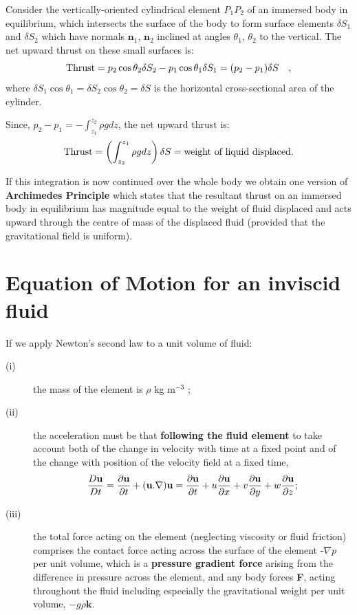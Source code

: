 \documentclass[twoside,a4paper,11pt]{report}
\begin{document}
Consider the vertically-oriented cylindrical element $P_{1} P_{2}$ of an 
immersed body in equilibrium, which intersects the surface of the body to 
form surface elements $\delta S_{1}$ and $\delta S_{2}$ which have 
normals $\textbf{n}_{1}$, $\textbf{n}_{2}$ inclined at angles $\theta _1$,
$\theta _2 $ to the vertical. The net upward thrust on these small 
surfaces is:
\[
\hbox{Thrust} =p_2 \cos \theta _2 \delta S_2 -p_1 \cos \theta _1 
\delta S_1 =(p_2 -p_1 )\delta S\quad ,
\]
where $\delta S_{1} \cos \theta _{1 }=\delta S_{2} \cos \theta 
_{2}=\delta S$ is the horizontal cross-sectional area of the cylinder. 

Since, $p_2 -p_1 =-\int_{z_1 }^{z_2 } {\rho gdz} $,
the net upward thrust is:
\[\hbox{Thrust}=\left( {\int_{z_2 }^{z_1 } {\rho gdz} } 
\right)\delta S = \hbox{weight of liquid displaced}. \]

If this integration is now continued over the whole body we obtain one 
version of \textbf{Archimedes Principle} which states that the resultant 
thrust on an immersed body in equilibrium has magnitude equal to the weight 
of fluid displaced and acts upward through the centre of mass of the 
displaced fluid (provided that the gravitational field is uniform).

\section{Equation of Motion for an inviscid fluid}
If we apply Newton's second law to a unit volume of fluid:
\begin{description}
\item[(i)] the mass of the element is $\rho $ kg m$^{-3}$ ;
\item[(ii)] the acceleration must be that \textbf{following the fluid element} to 
take account both of the change in velocity with time at a fixed point and 
of the change with position of the velocity field at a fixed time,
\[
\frac{D{{\bf u}}}{Dt}=\frac{\partial {{\bf u}}}{\partial 
t}+({{\bf u}}. \nabla ){{\bf 
u}}=\frac{\partial {{\bf u}}}{\partial 
t}+u\frac{\partial {{\bf u}}}{\partial 
x}+v\frac{\partial {{\bf u}}}{\partial 
y}+w\frac{\partial {{\bf u}}}{\partial z};
\]
\item[(iii)] the total force acting on the element (neglecting viscosity or fluid 
friction) comprises the contact force acting across the surface of the 
element -$\nabla p$ per unit volume, which is a \textbf{pressure gradient 
force} arising from the difference in pressure across the element, and any 
body forces \textbf{F}, acting throughout the fluid including especially the 
gravitational weight per unit volume, $-g\rho \textbf{k}$.
\end{description}
\end{document}
